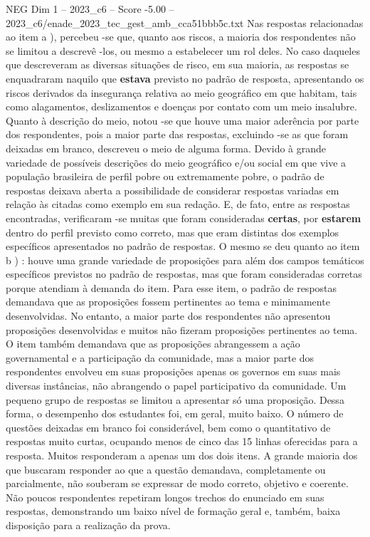 \begin{textsample}{NEG Dim 1 – 2023\_c6 – Score -5.00 – 2023\_c6/enade\_2023\_tec\_gest\_amb\_cca51bbb5c.txt}
Nas respostas relacionadas ao item a ), percebeu -se que, quanto aos riscos, a maioria dos respondentes não se limitou a descrevê -los, ou mesmo a estabelecer um rol deles.
No caso daqueles que descreveram as diversas situações de risco, em sua maioria, as respostas se enquadraram naquilo que \textbf{estava} previsto no padrão de resposta, apresentando os riscos derivados da insegurança relativa ao meio geográfico em que habitam, tais como alagamentos, deslizamentos e doenças por contato com um meio insalubre.
Quanto à descrição do meio, notou -se que houve uma maior aderência por parte dos respondentes, pois a maior parte das respostas, excluindo -se as que foram deixadas em branco, descreveu o meio de alguma forma.
Devido à grande variedade de possíveis descrições do meio geográfico e/ou social em que vive a população brasileira de perfil pobre ou extremamente pobre, o padrão de respostas deixava aberta a possibilidade de considerar respostas variadas em relação às citadas como exemplo em sua redação.
E, de fato, entre as respostas encontradas, verificaram -se muitas que foram consideradas \textbf{certas}, por \textbf{estarem} dentro do perfil previsto como correto, mas que eram distintas dos exemplos específicos apresentados no padrão de respostas.
O mesmo se deu quanto ao item b ) : houve uma grande variedade de proposições para além dos campos temáticos específicos previstos no padrão de respostas, mas que foram consideradas corretas porque atendiam à demanda do item.
Para esse item, o padrão de respostas demandava que as proposições fossem pertinentes ao tema e minimamente desenvolvidas.
No entanto, a maior parte dos respondentes não apresentou proposições desenvolvidas e muitos não fizeram proposições pertinentes ao tema.
O item também demandava que as proposições abrangessem a ação governamental e a participação da comunidade, mas a maior parte dos respondentes envolveu em suas proposições apenas os governos em suas mais diversas instâncias, não abrangendo o papel participativo da comunidade.
Um pequeno grupo de respostas se limitou a apresentar só uma proposição.
Dessa forma, o desempenho dos estudantes foi, em geral, muito baixo.
O número de questões deixadas em branco foi considerável, bem como o quantitativo de respostas muito curtas, ocupando menos de cinco das 15 linhas oferecidas para a resposta.
Muitos responderam a apenas um dos dois itens.
A grande maioria dos que buscaram responder ao que a questão demandava, completamente ou parcialmente, não souberam se expressar de modo correto, objetivo e coerente.
Não poucos respondentes repetiram longos trechos do enunciado em suas respostas, demonstrando um baixo nível de formação geral e, também, baixa disposição para a realização da prova.

\end{textsample}
